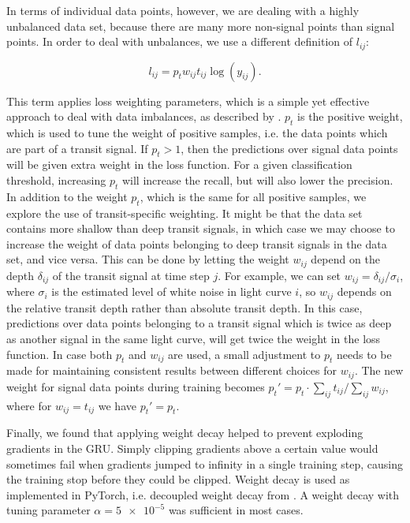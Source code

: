 

In terms of individual data points, however, we are dealing with a highly unbalanced data set, because there are many more non-signal points than signal points. In order to deal with unbalances, we use a different definition of $l_{ij}$:

\begin{equation}
    l_{ij} = p_t w_{ij} t_{ij} \log( y_{ij} ).
\end{equation}

This term applies loss weighting parameters, which is a simple yet effective approach to deal with data imbalances, as described by \cite{he2009learning}. $p_t$ is the positive weight, which is used to tune the weight of positive samples, i.e. the data points which are part of a transit signal. If $p_t > 1$, then the predictions over signal data points will be given extra weight in the loss function. For a given classification threshold, increasing $p_t$ will increase the recall, but will also lower the precision. In addition to the weight $p_t$, which is the same for all positive samples, we explore the use of transit-specific weighting. It might be that the data set contains more shallow than deep transit signals, in which case we may choose to increase the weight of data points belonging to deep transit signals in the data set, and vice versa. This can be done by letting the weight $w_{ij}$ depend on the depth $\delta_{ij}$ of the transit signal at time step $j$. For example, we can set $w_{ij} = \delta_{ij} / \sigma_{i}$, where $\sigma_i$ is the estimated level of white noise in light curve $i$, so $w_{ij}$ depends on the relative transit depth rather than absolute transit depth. In this case, predictions over data points belonging to a transit signal which is twice as deep as another signal in the same light curve, will get twice the weight in the loss function. In case both $p_t$ and $w_{ij}$ are used, a small adjustment to $p_t$ needs to be made for maintaining consistent results between different choices for $w_{ij}$. The new weight for signal data points during training becomes  $p_t' = p_t \cdot \sum_{ij} t_{ij} / \sum_{ij} w_{ij}$, where for $w_{ij} = t_{ij}$ we have $p_t' = p_t$.

Finally, we found that applying weight decay helped to prevent exploding gradients in the GRU. Simply clipping gradients above a certain value would sometimes fail when gradients jumped to infinity in a single training step, causing the training stop before they could be clipped. Weight decay is used as implemented in PyTorch, i.e. decoupled weight decay from \cite{loshchilov2017decoupled}. A weight decay with tuning parameter $\alpha=\num{5e-5}$ was sufficient in most cases.


